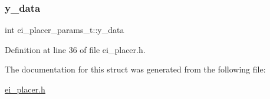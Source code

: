 \subsubsection{\texorpdfstring{y\+\_\+data}{y\_data}}
{\footnotesize\ttfamily int ei\+\_\+placer\+\_\+params\+\_\+t\+::y\+\_\+data}



Definition at line 36 of file ei\+\_\+placer.\+h.



The documentation for this struct was generated from the following file\+:\begin{DoxyCompactItemize}
\item 
\hyperlink{ei__placer_8h}{ei\+\_\+placer.\+h}\end{DoxyCompactItemize}
